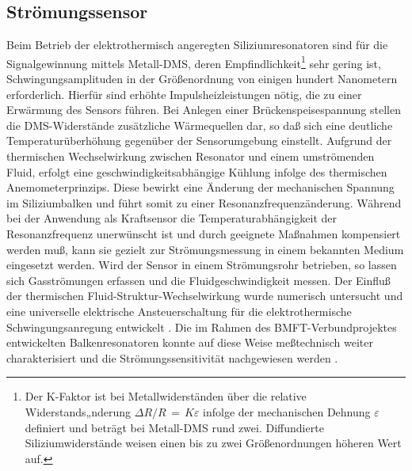 \subsection{Strömungssensor}
\label{stroemungssensor}

Beim Betrieb der elektrothermisch angeregten Siliziumresonatoren sind
für die Signalgewinnung mittels Metall-DMS, deren
Empfindlichkeit\footnote{Der K-Faktor ist bei Metallwiderständen über
die relative Widerstands„nderung $\Delta R/R \, = \, K \varepsilon$
infolge der mechanischen Dehnung $\varepsilon$
definiert und beträgt bei Metall-DMS rund zwei. Diffundierte
Siliziumwiderstände weisen einen bis zu zwei Größenordnungen höheren
Wert auf.} sehr gering ist,
Schwingungsamplituden in der Größenordnung von einigen hundert
Nanometern erforderlich. Hierfür sind erhöhte Impulsheizleistungen nötig,
die zu einer Erwärmung des Sensors führen. Bei Anlegen einer
Brückenspeisespannung stellen die DMS-Widerstände zusätzliche Wärmequellen
dar, so daß sich eine deutliche Temperaturüberhöhung gegenüber der
Sensorumgebung einstellt. Aufgrund der thermischen Wechselwirkung zwischen
Resonator und einem umströmenden Fluid, erfolgt eine
geschwindigkeitsabhängige Kühlung infolge des thermischen
Anemometerprinzips. Diese bewirkt eine Änderung der mechanischen
Spannung im Siliziumbalken und führt somit zu einer Resonanzfrequenzänderung.
Während bei der Anwendung als Kraftsensor die Temperaturabhängigkeit der
Resonanzfrequenz unerwünscht ist und durch geeignete Maßnahmen kompensiert
werden muß, kann sie gezielt zur Strömungsmessung in einem bekannten Medium
eingesetzt werden. Wird der Sensor in einem Strömungsrohr betrieben, so
lassen sich
Gasströmungen erfassen und die Fluidgeschwindigkeit messen. Der Einfluß der
thermischen Fluid-Struktur-Wechselwirkung wurde numerisch untersucht
\cite{Mes93} und eine universelle elektrische Ansteuerschaltung für die
elektrothermische
Schwingungsanregung entwickelt \cite{Wie93}. Die im Rahmen des
BMFT-Verbundprojektes entwickelten Balkenresonatoren konnte auf diese Weise
meßtechnisch weiter charakterisiert und die Strömungssensitivität
nachgewiesen werden \cite{Fab93b}.
